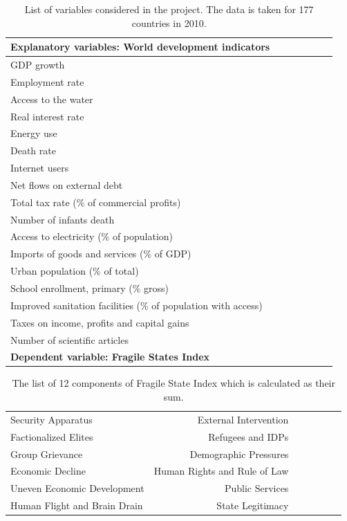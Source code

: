\documentclass{article}
\begin{document}
\begin{table}[h]
\begin{center}
{\renewcommand{\arraystretch}{1.2}
\begin{tabular}{lrrrrll}
\toprule
\textbf{Explanatory variables: World development indicators} &  \\
\midrule
GDP growth	&	\\
Employment rate	&	\\
Access to the water &	\\
Real interest rate	&	\\
Energy use	&	\\
Death rate	&	\\
Internet users	&	\\
Net flows on external debt	&	\\
Total tax rate (\% of commercial profits)	&	\\
Number of infants death	&	\\
Access to electricity (\% of population)	&	\\
Imports of goods and services (\% of GDP)	&	\\
Urban population (\% of total)	&	\\
School enrollment, primary (\% gross)	&	\\
Improved sanitation facilities (\% of population with access)	&	\\
Taxes on income, profits and capital gains & \\
Number of scientific articles	&	\\
\midrule
\textbf{Dependent variable: Fragile States Index}	&	\\
\bottomrule
\end{tabular}}
\caption{List of variables considered in the project. The data is taken for 177 countries in 2010.}
\label{table:ind}
\end{center}
\end{table} 

\begin{table}[h]
\begin{center}
{\renewcommand{\arraystretch}{1.2}
\begin{tabular}{lrrrrll}
\toprule
Security Apparatus	&	External Intervention\\
Factionalized Elites	&	Refugees and IDPs\\
Group Grievance	&	Demographic Pressures\\
Economic Decline	&	Human Rights and Rule of Law\\
Uneven Economic Development	& Public Services	\\
Human Flight and Brain Drain & State Legitimacy	\\
\bottomrule
\end{tabular}}
\caption{The list of 12 components of Fragile State Index which is calculated as their sum.}
\label{table:components}
\end{center}
\end{table} 
\end{document}
